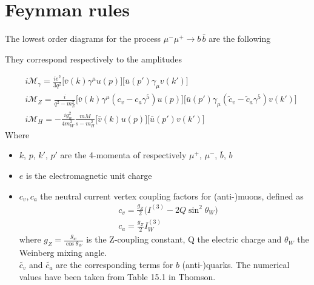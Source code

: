 \documentclass[12pt,letterpaper]{article}
\begin{document}
\section{Feynman rules}
The lowest order diagrams for the process $\mu^- \mu^+ \rightarrow b\, \bar{b}$ are the following

\begin{figure}[!h]
\qquad
{}\qquad
{}\qquad
\end{figure}

They correspond respectively to the amplitudes

\begin{align*}
&i\mathcal{M}_{\gamma} = \frac{ie^2}{3q^2}\big[ \bar{v}(k)\gamma^{\mu}u(p) \big]\big[ \bar{u}(p')\gamma_{\mu}v(k') \big]\\
&i\mathcal{M}_Z = \frac{i}{q^2-m_Z^2}\big[ \bar{v}(k)\gamma^{\mu}(c_v - c_a\gamma^5)u(p) \big]\big[ \bar{u}(p')\gamma_{\mu}(\tilde{c}_v-\tilde{c}_a\gamma^5)v(k') \big]\\
&i\mathcal{M}_H = -\frac{ig_w^2}{4m_W^2}\frac{mM}{s-m_H^2} \big[\bar{v}(k)u(p)\big]\big[ \bar{u}(p')v(k')\big]
\end{align*}
Where 
\begin{itemize}
\item $k$, $p$, $k'$, $p'$ are the 4-momenta of respectively $\mu^+$, $\mu^-$, $\bar{b}$, $b$ 
\item $e$ is the electromagnetic unit charge
\item $c_v,c_a$ the neutral current vertex coupling factors for (anti-)muons, defined as
\begin{align*}
&c_v = \frac{g_Z}{2}\big( I^{(3)} - 2Q\sin^2\theta_W \big)\\
&c_a = \frac{g_Z}{2}I^{(3)}_W
\end{align*}  
where $g_Z=\frac{g_{w}}{\cos\theta_W}$ is the Z-coupling constant, Q the electric charge and $\theta_W$ the Weinberg mixing angle.\\
$\tilde{c_v}$ and $\tilde{c_a}$ are the corresponding terms for $b$ (anti-)quarks. The numerical values have been taken from Table 15.1 in Thomson.

\end{itemize}
\end{document}
